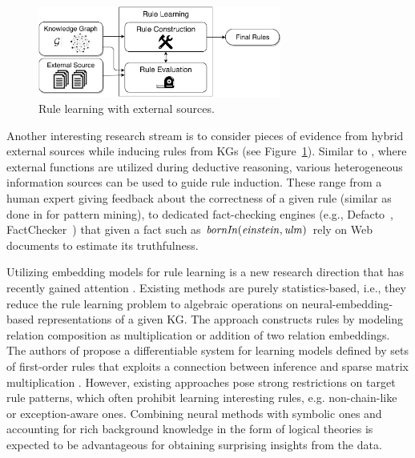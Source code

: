\begin{figure}[t]
\centering
\includegraphics[width=8cm]{figures/discussion_overview}
\caption{Rule learning with external sources.}
\label{fig:discussion_overview}
\end{figure}


Another interesting research stream is to consider pieces of evidence from hybrid external sources while inducing rules from KGs
(see Figure~\ref{fig:discussion_overview}). Similar to \cite{DBLP:conf/rweb/EiterKRSW17}, where external functions are utilized during deductive reasoning, various heterogeneous information sources can be used to guide rule induction. These range from a human expert giving feedback about the correctness of a given rule (similar as done in \cite{Dzyuba2017} for pattern mining), to dedicated fact-checking engines (e.g., Defacto~\cite{defacto}, FactChecker~\cite{factchecker}) that given a fact such as $\mathit{bornIn(einstein,ulm)}$ rely on Web documents to estimate its truthfulness. 


 Utilizing embedding models for rule learning is a new research direction that has recently gained attention \cite{DBLP:conf/nips/YangYC17,DBLP:journals/corr/YangYHGD14a}. Existing methods are purely statistics-based, i.e., they reduce the rule learning problem to algebraic operations on neural-embedding-based representations of a given KG. The approach \cite{DBLP:journals/corr/YangYHGD14a} constructs rules by modeling relation composition as multiplication or addition of two relation embeddings. The authors of \cite{DBLP:conf/nips/YangYC17} propose a differentiable system for learning models defined by sets of first-order rules that exploits a connection between inference and sparse matrix multiplication \cite{DBLP:journals/corr/Cohen16b}. However, existing approaches pose strong restrictions on target rule patterns, which often prohibit learning interesting rules, e.g. non-chain-like or exception-aware ones. Combining neural methods with symbolic ones and accounting for rich background knowledge in the form of logical theories is expected to be advantageous for obtaining surprising insights from the data.


